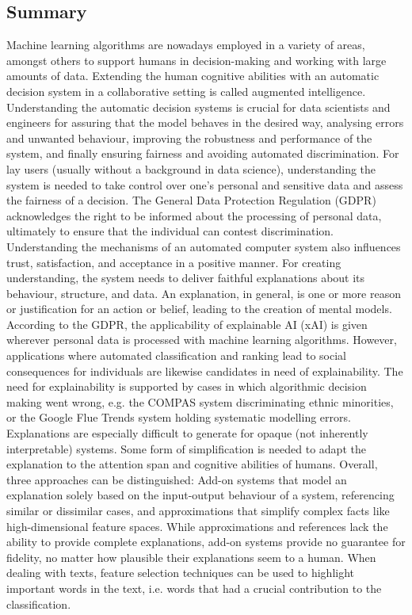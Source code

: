 \subsection{Summary}
Machine learning algorithms are nowadays employed in a variety of areas, amongst others to support humans in decision-making and working with large amounts of data. Extending the human cognitive abilities with an automatic decision system in a collaborative setting is called augmented intelligence. Understanding the automatic decision systems is crucial for data scientists and engineers for assuring that the model behaves in the desired way, analysing errors and unwanted behaviour, improving the robustness and performance of the system, and finally ensuring fairness and avoiding automated discrimination. For lay users (usually without a background in data science), understanding the system is needed to take control over one's personal and sensitive data and assess the fairness of a decision. The General Data Protection Regulation (GDPR) acknowledges the right to be informed about the processing of personal data, ultimately to ensure that the individual can contest discrimination. Understanding the mechanisms of an automated computer system also influences trust, satisfaction, and acceptance in a positive manner. For creating understanding, the system needs to deliver faithful explanations about its behaviour, structure, and data. An explanation, in general, is one or more reason or justification for an action or belief, leading to the creation of mental models.\newline
According to the GDPR, the applicability of explainable AI (xAI) is given wherever personal data is processed with machine learning algorithms. However, applications where automated classification and ranking lead to social consequences for individuals are likewise candidates in need of explainability. The need for explainability is supported by cases in which algorithmic decision making went wrong, e.g. the COMPAS system discriminating ethnic minorities, or the Google Flue Trends system holding systematic modelling errors. Explanations are especially difficult to generate for opaque (not inherently interpretable) systems. Some form of simplification is needed to adapt the explanation to the attention span and cognitive abilities of humans. Overall, three approaches can be distinguished: Add-on systems that model an explanation solely based on the input-output behaviour of a system, referencing similar or dissimilar cases, and approximations that simplify complex facts like high-dimensional feature spaces. While approximations and references lack the ability to provide complete explanations, add-on systems provide no guarantee for fidelity, no matter how plausible their explanations seem to a human. When dealing with texts, feature selection techniques can be used to highlight important words in the text, i.e. words that had a crucial contribution to the classification.\medskip\newline 
